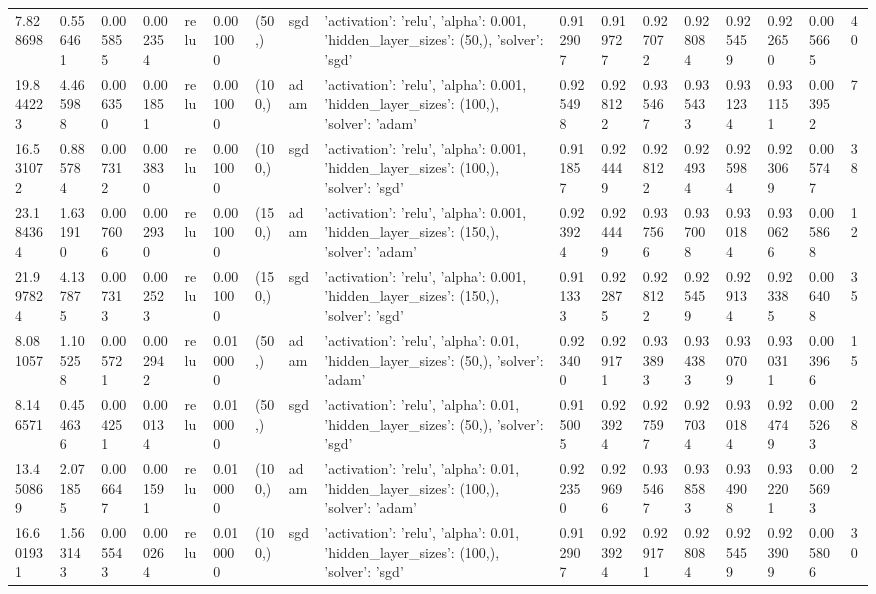 \documentclass[a1paper]{article}  %
\begin{document}
\begin{landscape}
\begin{tabular}{lllllllllllllllll}
		7.828698 & 0.556461 & 0.005855 & 0.002354 & relu & 0.001000 & (50,) & sgd & {'activation': 'relu', 'alpha': 0.001, 'hidden\_layer\_sizes': (50,), 'solver': 'sgd'} & 0.912907 & 0.919727 & 0.927072 & 0.928084 & 0.925459 & 0.922650 & 0.005665 & 40 \\
		19.844223 & 4.465988 & 0.006350 & 0.001851 & relu & 0.001000 & (100,) & adam & {'activation': 'relu', 'alpha': 0.001, 'hidden\_layer\_sizes': (100,), 'solver': 'adam'} & 0.925498 & 0.928122 & 0.935467 & 0.935433 & 0.931234 & 0.931151 & 0.003952 & 7 \\
		16.531072 & 0.885784 & 0.007312 & 0.003830 & relu & 0.001000 & (100,) & sgd & {'activation': 'relu', 'alpha': 0.001, 'hidden\_layer\_sizes': (100,), 'solver': 'sgd'} & 0.911857 & 0.924449 & 0.928122 & 0.924934 & 0.925984 & 0.923069 & 0.005747 & 38 \\
		23.184364 & 1.631910 & 0.007606 & 0.002930 & relu & 0.001000 & (150,) & adam & {'activation': 'relu', 'alpha': 0.001, 'hidden\_layer\_sizes': (150,), 'solver': 'adam'} & 0.923924 & 0.924449 & 0.937566 & 0.937008 & 0.930184 & 0.930626 & 0.005868 & 12 \\
		21.997824 & 4.137875 & 0.007313 & 0.002523 & relu & 0.001000 & (150,) & sgd & {'activation': 'relu', 'alpha': 0.001, 'hidden\_layer\_sizes': (150,), 'solver': 'sgd'} & 0.911333 & 0.922875 & 0.928122 & 0.925459 & 0.929134 & 0.923385 & 0.006408 & 35 \\
		8.081057 & 1.105258 & 0.005721 & 0.002942 & relu & 0.010000 & (50,) & adam & {'activation': 'relu', 'alpha': 0.01, 'hidden\_layer\_sizes': (50,), 'solver': 'adam'} & 0.923400 & 0.929171 & 0.933893 & 0.934383 & 0.930709 & 0.930311 & 0.003966 & 15 \\
		8.146571 & 0.454636 & 0.004251 & 0.000134 & relu & 0.010000 & (50,) & sgd & {'activation': 'relu', 'alpha': 0.01, 'hidden\_layer\_sizes': (50,), 'solver': 'sgd'} & 0.915005 & 0.923924 & 0.927597 & 0.927034 & 0.930184 & 0.924749 & 0.005263 & 28 \\
		13.450869 & 2.071855 & 0.006647 & 0.001591 & relu & 0.010000 & (100,) & adam & {'activation': 'relu', 'alpha': 0.01, 'hidden\_layer\_sizes': (100,), 'solver': 'adam'} & 0.922350 & 0.929696 & 0.935467 & 0.938583 & 0.934908 & 0.932201 & 0.005693 & 2 \\
		16.601931 & 1.563143 & 0.005543 & 0.000264 & relu & 0.010000 & (100,) & sgd & {'activation': 'relu', 'alpha': 0.01, 'hidden\_layer\_sizes': (100,), 'solver': 'sgd'} & 0.912907 & 0.923924 & 0.929171 & 0.928084 & 0.925459 & 0.923909 & 0.005806 & 30 \\

\end{tabular}
\end{landscape}
\end{document}
